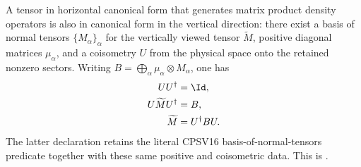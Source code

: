 \begin{theorem}
    \label{thm:vertical_cf_of_horizontal_cf}
    \leanok
    A tensor in horizontal canonical form that generates matrix product
    density operators is also in canonical form in the vertical direction:
    there exist a basis of normal tensors $\{M_\alpha\}_\alpha$ for the
    vertically viewed tensor $\widetilde M$, positive diagonal matrices
    $\mu_\alpha$, and a coisometry $U$ from the physical space onto the
    retained nonzero sectors. Writing
    $B=\bigoplus_\alpha\mu_\alpha\otimes M_\alpha$, one has
    \begin{align}
        UU^\dagger&=\Id,
        \notag\\
        U\widetilde MU^\dagger&=B,
        \notag\\
        \widetilde M&=U^\dagger BU.
        \notag
    \end{align}
    The latter declaration retains the literal CPSV16 basis-of-normal-tensors
    predicate together with these same positive and coisometric data.
    This is \cite[Proposition~4.13]{Cirac2016MPDO_arXiv}.
\end{theorem}

